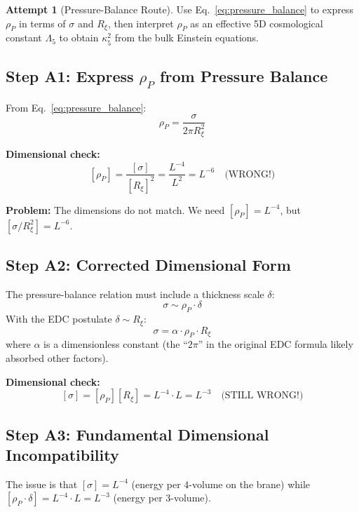 \documentclass[11pt,a4paper]{article}
\theoremstyle{definition}
\newtheorem{attempt}{Attempt}
\begin{document}
\begin{attempt}[Pressure-Balance Route]
Use Eq.~\eqref{eq:pressure_balance} to express $\rho_P$ in terms of $\sigma$ and $R_\xi$,
then interpret $\rho_P$ as an effective 5D cosmological constant $\Lambda_5$ to obtain
$\kappa_5^2$ from the bulk Einstein equations.
\end{attempt}

\subsection{Step A1: Express $\rho_P$ from Pressure Balance}

From Eq.~\eqref{eq:pressure_balance}:
\begin{equation}
\rho_P = \frac{\sigma}{2\pi R_\xi^2}
\label{eq:rhoP_from_sigma}
\end{equation}

\textbf{Dimensional check:}
\[
[\rho_P] = \frac{[\sigma]}{[R_\xi]^2} = \frac{L^{-4}}{L^2} = L^{-6} \quad \text{(WRONG!)}
\]

\textbf{Problem:} The dimensions do not match. We need $[\rho_P] = L^{-4}$, but
$[\sigma/R_\xi^2] = L^{-6}$.

\subsection{Step A2: Corrected Dimensional Form}

The pressure-balance relation must include a thickness scale $\delta$:
\begin{equation}
\sigma \sim \rho_P \cdot \delta
\label{eq:pressure_correct}
\end{equation}
With the EDC postulate $\delta \sim R_\xi$:
\begin{equation}
\sigma = \alpha \cdot \rho_P \cdot R_\xi
\label{eq:sigma_rhoP_Rxi}
\end{equation}
where $\alpha$ is a dimensionless constant (the ``$2\pi$'' in the original EDC formula
likely absorbed other factors).

\textbf{Dimensional check:}
\[
[\sigma] = [\rho_P][R_\xi] = L^{-4} \cdot L = L^{-3} \quad \text{(STILL WRONG!)}
\]

\subsection{Step A3: Fundamental Dimensional Incompatibility}

The issue is that $[\sigma] = L^{-4}$ (energy per 4-volume on the brane) while
$[\rho_P \cdot \delta] = L^{-4} \cdot L = L^{-3}$ (energy per 3-volume).
\end{document}
